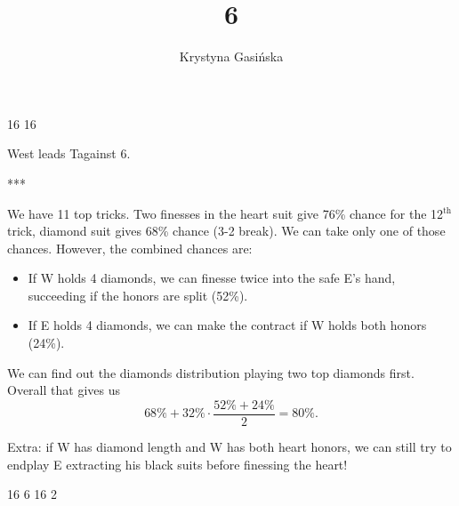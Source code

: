\documentclass[12pt, a4paper]{article}
\title{6\nt}
\author{Krystyna Gasińska}
\begin{document}
\maketitle

\handdiagramh
        {}{16}
        {}{}
        {}{16}
        {}{}
        {}

West leads T\spades against 6\nt.
\begin{center}
    ***
\end{center}

We have 11 top tricks. Two finesses in the 
heart suit give 76\% chance for
the 12$^{\text{th}}$ trick, diamond suit gives 68\% chance 
(3-2 break).
We can take only one of those chances. 
However, the combined chances are:
\begin{itemize}
        \item If W holds 4 diamonds, we can finesse twice
        into the safe E's hand, succeeding if the
        honors are split (52\%).
        \item If E holds 4 diamonds, we can make the
        contract if W holds both \hearts honors (24\%).
\end{itemize}

We can find out the diamonds distribution playing 
two top diamonds first. Overall that gives us
$$68\%+32\%\cdot\frac{52\%+24\%}{2} = 80\%.$$

\newpage

Extra: if W has diamond length and W has both heart honors,
we can still try to endplay E extracting his black suits before
finessing the heart!

\handdiagramh
        {}{16}
        {}{6}
        {}{16}
        {}{2}
        {}
\end{document}
